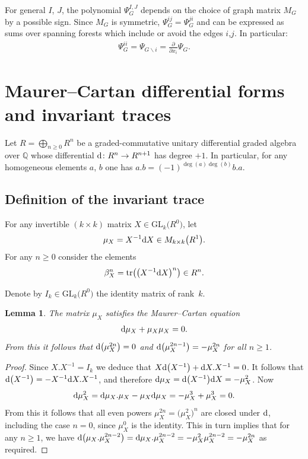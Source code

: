 \documentclass[pdftex]{sigma}%
\newtheorem{lem}[thm]{Lemma}
\numberwithin{equation}{section}
\newcommand{\Q}{\mathbb Q}
\newcommand{\tr}{\mathrm{tr}}
\newcommand{\GL}{\mathrm{GL}}
\newcommand{\mc}{\mu}
\newcommand{\0}{\color{blue}{\mathsf{0}}}
\begin{document}
For general $I$, $J$, the polynomial $\Psi^{I,J}_G$ depends on the choice of graph matrix $M_G$ by a possible sign.
Since $M_G$ is symmetric, $\Psi_G^{ij}= \Psi_G^{ji}$
 and can be expressed as sums over spanning forests which include or avoid the edges $i$,$j$. In particular:
\begin{gather*} %
\Psi_G^{ii} = \Psi_{G \backslash i } = \frac{\partial}{\partial x_i} \Psi_G.
\end{gather*}

\section{Maurer--Cartan differential forms and invariant traces}

Let $R=\bigoplus_{n\geq 0 } R^n$ be a graded-commutative unitary differential graded algebra over $\Q$ whose differential ${\rm d}\colon R^n \rightarrow R^{n+1}$ has degree $+1$. In particular, for any homogeneous elements $a$, $b$ one has $a. b = (-1)^{\deg(a) \deg(b)} b.a$.

\subsection{Definition of the invariant trace} \label{sect: defbetabasic}

\begin{defn}
For any invertible $(k\times k)$ matrix $X \in \GL_k\big(R^0\big)$, let
\begin{gather*}
\mc_X = X^{-1} {\rm d}X \in M_{k \times k} \big(R^1\big) .
\end{gather*}
For any $n\geq 0$ consider the elements
\begin{gather*}
\beta^n_X = \tr \big(\big(X^{-1} {\rm d}X\big)^n\big) \in R^n .
\end{gather*}
\end{defn}
Denote by $I_k \in \GL_k\big(R^0\big)$ the identity matrix of rank~$k$.
 \begin{lem} \label{lemma: MC}
 The matrix $\mc_X$ satisfies the Maurer--Cartan equation
 \begin{gather*}
 {\rm d} \mc_X + \mc_X \mc_X = 0 .
 \end{gather*}
 From this it follows that $ {\rm d}\big(\mc_X^{2n}\big)=0$ and ${\rm d}\big(\mc_X^{2n-1}\big) = - \mc_X^{2n}$ for all $n \geq 1$.
 \end{lem}
 \begin{proof}
 Since $X. X^{-1} =I_k$ we deduce that $X {\rm d}\big(X^{-1}\big) + {\rm d}X. X^{-1} =0$. It follows that ${\rm d}\big(X^{-1}\big) = -X^{-1} {\rm d}X. X^{-1}$, and therefore ${\rm d} \mc_X = {\rm d}\big(X^{-1}\big) {\rm d}X= - \mc_X^2$. Now
 \begin{gather*}
 {\rm d} \mc_X^2 = {\rm d}\mc_X . \mc_X - \mc_X {\rm d}\mc_X = - \mc_X^3 + \mc_X^3=0.
 \end{gather*}
 From this it follows that all even powers $\mc^{2n}_X = \big(\mc_X^2\big)^n$ are closed under ${\rm d}$, including the case $n=0$, since $\mc_X^0$ is the identity. This in turn implies that for any $n\geq 1$, we have ${\rm d} \big(\mc_X . \mc_X^{2n-2}\big) = {\rm d}\mc_X. \mc_X^{2n-2} = -\mc_X^2 \mc_X^{2n-2} =- \mc_X^{2n}$ as required.
 \end{proof}
\end{document}
